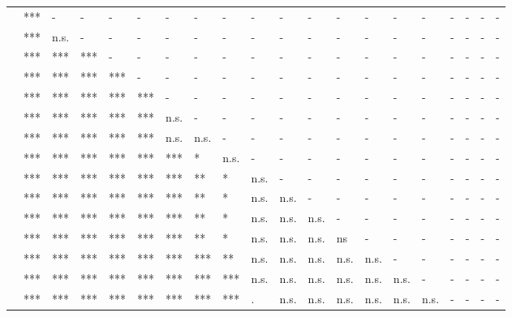 \documentclass[11pt,fleqn]{article}
\newcommand{\6}{\mbox{$[\hspace*{-.6mm}[$}}
\newcommand{\9}{\mbox{$]\hspace*{-.6mm}]$}}
\begin{document}
\begin{table}[h!]
\begin{tabular}{l l l l l l l l l l l l l l l l l l l l }
\color{brown}{\em think}\color{black}		& *** & - & - & - & - & - & - & - & - & - & - & - & - & - & - & - & - & - & - \\
\color{brown}{\em suggest}\color{black}			& *** & n.s. & - & - & - & - & - & - & - & - & - & - & - & - & - & - & - & - & - \\
\color{brown}{\em hear}	\color{black}		& *** & *** & *** & - & - & - & - & - & - & - & - & - & - & - & - & - & - & - & - \\
\color{brown}{\em say}\color{black}		& *** & *** & *** & *** & - & - & - & - & - & - & - & - & - & - & - & - & - & - & - \\
\color{black}{\em announce}\color{black}		& *** & *** & *** & *** & *** & - & - & - & - & - & - & - & - & - & - & - & - & - & - \\
\color{black}{\em inform}\color{black}		& *** & *** & *** & *** & *** & n.s. & - & - & - & - & - & - & - & - & - & - & - & - & - \\
\color{airforceblue}{\em demonstrate}\color{black}		& *** & *** & *** & *** & *** & n.s. & n.s. & - & - & - & - & - & - & - & - & - & - & - & - \\
\color{black}{\em confess}\color{black}		& *** & *** & *** & *** & *** & *** & * & n.s. & - & - & - & - & - & - & - & - & - & - & - \\
\color{blue}{\em reveal}\color{black}		& *** & *** & *** & *** & *** & *** & ** & * & n.s. & - & - & - & - & - & - & - & - & - & - \\
\color{black}{\em acknowledge}\color{black}	& *** & *** & *** & *** & *** & *** & ** & * & n.s. & n.s. & - & - & - & - & - & - & - & - & - \\
\color{black}{\em admit}\color{black}			& *** & *** & *** & *** & *** & *** & ** & * & n.s. & n.s. & n.s. & - & - & - & - & - & - & - & - \\
\color{airforceblue}{\em establish}\color{black}		& *** & *** & *** & *** & *** & *** & ** & * & n.s. & n.s. & n.s. &  ns & - & - & - & - & - & - & - \\
\color{blue}{\em be annoyed}\color{black}	& *** & *** & *** & *** & *** & *** & *** & ** & n.s. & n.s. & n.s. & n.s. & n.s. & - & - & - & - & - & - \\
\color{blue}{\em know}\color{black}		& *** & *** & *** & *** & *** & *** & *** & *** & n.s. & n.s. & n.s. & n.s. & n.s. & n.s. & - & - & - & - & - \\
\color{black}{\em confirm}\color{black}		& *** & *** & *** & *** & *** & *** & *** & *** & . & n.s. & n.s. & n.s. & n.s. & n.s. & n.s. & - & - & - & - \\

\end{tabular}
\end{table}
\end{document}

